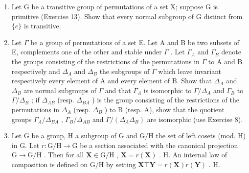 \begin{enumerate}
\def\labelenumi{\arabic{enumi}.}
\setcounter{enumi}{16}
\item
  Let G be a transitive group of permutations of a set X; suppose G is primitive (Exercise 13). Show that every normal subgroup of G distinct from \(\{e\}\) is transitive.
\item
  Let \(\Gamma\) be a group of permutations of a set E. Let A and B be two subsets of E, complements one of the other and stable under \(\Gamma\) . Let \(\Gamma_{A}\) and \(\Gamma_{B}\) denote the groups consisting of the restrictions of the permutations in \(\Gamma\) to A and B respectively and \(\Delta_{A}\) and \(\Delta_{B}\) the subgroups of \(\Gamma\) which leave invariant respectively every element of A and every element of B. Show that \(\Delta_{A}\) and \(\Delta_{B}\) are normal subgroups of \(\Gamma\) and that \(\Gamma_{A}\) is isomorphic to \(\Gamma/\Delta_{A}\) and \(\Gamma_{B}\) to \(\Gamma/\Delta_{B}\) ; if \(\Delta_{AB}\) (resp. \(\Delta_{BA}\) ) is the group consisting of the restrictions of the permutations in \(\Delta_{A}\) (resp. \(\Delta_{B}\) ) to B (resp. A), show that the quotient groups \(\Gamma_{A}/\Delta_{BA}\) , \(\Gamma_{B}/\Delta_{AB}\) and \(\Gamma/(\Delta_{A}\Delta_{B})\) are isomorphic (use Exercise 8).
\item
  Let G be a group, H a subgroup of G and G/H the set of left cosets (mod. H) in G. Let \(r: \mathrm{G} / \mathrm{H} \to \mathrm{G}\) be a section associated with the canonical projection \(\mathrm{G} \to \mathrm{G} / \mathrm{H}\) . Then for all \(\mathbf{X} \in \mathrm{G} / \mathrm{H}\) , \(\mathbf{X} = r(\mathbf{X})\) . H. An internal law of composition is defined on G/H by setting \(\mathbf{X} \top \mathbf{Y} = r(\mathbf{X})r(\mathbf{Y})\) . H.
\end{enumerate}

